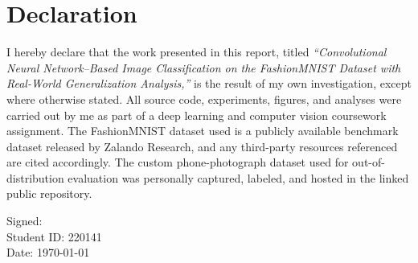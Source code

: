 \documentclass[12pt,a4paper]{report}
\begin{document}
\chapter*{Declaration}
I hereby declare that the work presented in this report, titled \emph{``Convolutional Neural Network--Based Image Classification on the FashionMNIST Dataset with Real-World Generalization Analysis,''} is the result of my own investigation, except where otherwise stated. All source code, experiments, figures, and analyses were carried out by me as part of a deep learning and computer vision coursework assignment. The FashionMNIST dataset used is a publicly available benchmark dataset released by Zalando Research, and any third-party resources referenced are cited accordingly. The custom phone-photograph dataset used for out-of-distribution evaluation was personally captured, labeled, and hosted in the linked public repository.

\vspace{1cm}
\noindent Signed: \underline{\hspace{5cm}} \\[0.3cm]
\noindent Student ID: 220141 \\[0.3cm]
\noindent Date: \today
\end{document}
